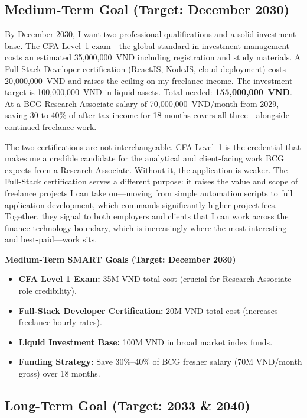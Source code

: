 \subsection{Medium-Term Goal (Target: December 2030)}

By December 2030, I want two professional qualifications and a solid investment base. The CFA Level~1 exam---the global standard in investment management---costs an estimated 35,000,000~VND including registration and study materials. A Full-Stack Developer certification (ReactJS, NodeJS, cloud deployment) costs 20,000,000~VND and raises the ceiling on my freelance income. The investment target is 100,000,000~VND in liquid assets. Total needed: \textbf{155,000,000~VND}. At a BCG Research Associate salary of 70,000,000~VND/month from 2029, saving 30 to 40\% of after-tax income for 18 months covers all three---alongside continued freelance work.

The two certifications are not interchangeable. CFA Level~1 is the credential that makes me a credible candidate for the analytical and client-facing work BCG expects from a Research Associate. Without it, the application is weaker. The Full-Stack certification serves a different purpose: it raises the value and scope of freelance projects I can take on---moving from simple automation scripts to full application development, which commands significantly higher project fees. Together, they signal to both employers and clients that I can work across the finance-technology boundary, which is increasingly where the most interesting---and best-paid---work sits.

\begin{takeawaybox}
  \textbf{Medium-Term SMART Goals (Target: December 2030)}
  \begin{itemize}[leftmargin=*]
    \item \textbf{CFA Level 1 Exam:} 35M VND total cost (crucial for Research Associate role credibility).
    \item \textbf{Full-Stack Developer Certification:} 20M VND total cost (increases freelance hourly rates).
    \item \textbf{Liquid Investment Base:} 100M VND in broad market index funds.
    \item \textbf{Funding Strategy:} Save 30\%--40\% of BCG fresher salary (70M VND/month gross) over 18 months.
  \end{itemize}
\end{takeawaybox}

\subsection{Long-Term Goal (Target: 2033 \& 2040)}

